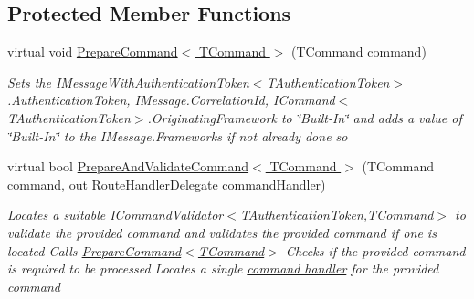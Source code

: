 \subsection*{Protected Member Functions}
\begin{DoxyCompactItemize}
\item 
virtual void \hyperlink{classCqrs_1_1Bus_1_1InProcessBus_ab0064808b1b619bee57fa5eff49bfca7}{Prepare\+Command$<$ T\+Command $>$} (T\+Command command)
\begin{DoxyCompactList}\small\item\em Sets the I\+Message\+With\+Authentication\+Token$<$\+T\+Authentication\+Token$>$.\+Authentication\+Token, I\+Message.\+Correlation\+Id, I\+Command$<$\+T\+Authentication\+Token$>$.\+Originating\+Framework to \char`\"{}\+Built-\/\+In\char`\"{} and adds a value of \char`\"{}\+Built-\/\+In\char`\"{} to the I\+Message.\+Frameworks if not already done so \end{DoxyCompactList}\item 
virtual bool \hyperlink{classCqrs_1_1Bus_1_1InProcessBus_a603950d39c407d5b9661dc0937fa67cc}{Prepare\+And\+Validate\+Command$<$ T\+Command $>$} (T\+Command command, out \hyperlink{classCqrs_1_1Bus_1_1RouteHandlerDelegate}{Route\+Handler\+Delegate} command\+Handler)
\begin{DoxyCompactList}\small\item\em Locates a suitable I\+Command\+Validator$<$\+T\+Authentication\+Token,\+T\+Command$>$ to validate the provided {\itshape command}  and validates the provided {\itshape command}  if one is located Calls \hyperlink{classCqrs_1_1Bus_1_1InProcessBus_ab0064808b1b619bee57fa5eff49bfca7}{Prepare\+Command$<$\+T\+Command$>$} Checks if the provided {\itshape command}  is required to be processed Locates a single \hyperlink{classCqrs_1_1Bus_1_1RouteHandlerDelegate}{command handler} for the provided {\itshape command}  \end{DoxyCompactList}\end{DoxyCompactItemize}
